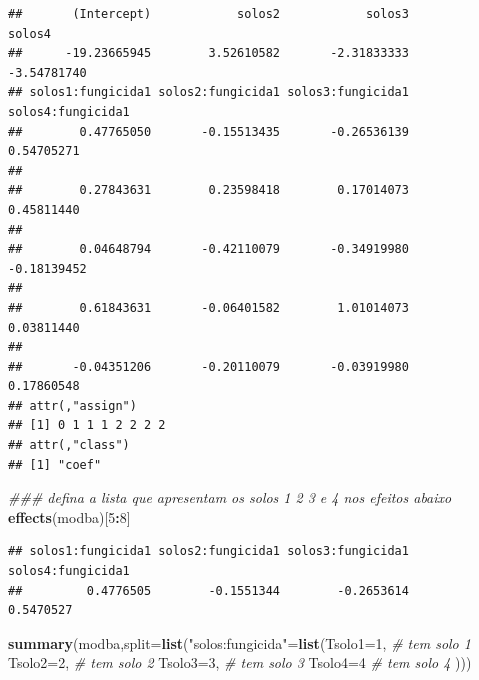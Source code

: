 \documentclass[
]{book}
\newenvironment{Shaded}{\begin{snugshade}}{\end{snugshade}}
\newcommand{\CommentTok}[1]{\textcolor[rgb]{0.56,0.35,0.01}{\textit{#1}}}
\newcommand{\DataTypeTok}[1]{\textcolor[rgb]{0.13,0.29,0.53}{#1}}
\newcommand{\DecValTok}[1]{\textcolor[rgb]{0.00,0.00,0.81}{#1}}
\newcommand{\KeywordTok}[1]{\textcolor[rgb]{0.13,0.29,0.53}{\textbf{#1}}}
\newcommand{\NormalTok}[1]{#1}
\newcommand{\OperatorTok}[1]{\textcolor[rgb]{0.81,0.36,0.00}{\textbf{#1}}}
\newcommand{\StringTok}[1]{\textcolor[rgb]{0.31,0.60,0.02}{#1}}
\begin{document}
\begin{verbatim}
##       (Intercept)            solos2            solos3            solos4 
##      -19.23665945        3.52610582       -2.31833333       -3.54781740 
## solos1:fungicida1 solos2:fungicida1 solos3:fungicida1 solos4:fungicida1 
##        0.47765050       -0.15513435       -0.26536139        0.54705271 
##                                                                         
##        0.27843631        0.23598418        0.17014073        0.45811440 
##                                                                         
##        0.04648794       -0.42110079       -0.34919980       -0.18139452 
##                                                                         
##        0.61843631       -0.06401582        1.01014073        0.03811440 
##                                                                         
##       -0.04351206       -0.20110079       -0.03919980        0.17860548 
## attr(,"assign")
## [1] 0 1 1 1 2 2 2 2
## attr(,"class")
## [1] "coef"
\end{verbatim}

\begin{Shaded}
\begin{Highlighting}[]
\CommentTok{### defina a lista que apresentam os solos 1 2 3 e 4 nos efeitos abaixo}
\KeywordTok{effects}\NormalTok{(modba)[}\DecValTok{5}\OperatorTok{:}\DecValTok{8}\NormalTok{]}
\end{Highlighting}
\end{Shaded}

\begin{verbatim}
## solos1:fungicida1 solos2:fungicida1 solos3:fungicida1 solos4:fungicida1 
##         0.4776505        -0.1551344        -0.2653614         0.5470527
\end{verbatim}

\begin{Shaded}
\begin{Highlighting}[]
\KeywordTok{summary}\NormalTok{(modba,}\DataTypeTok{split=}\KeywordTok{list}\NormalTok{(}\StringTok{"solos:fungicida"}\NormalTok{=}\KeywordTok{list}\NormalTok{(}\DataTypeTok{Tsolo1=}\DecValTok{1}\NormalTok{, }\CommentTok{# tem solo 1}
                                                \DataTypeTok{Tsolo2=}\DecValTok{2}\NormalTok{, }\CommentTok{# tem solo 2}
                                                \DataTypeTok{Tsolo3=}\DecValTok{3}\NormalTok{, }\CommentTok{# tem solo 3}
                                                \DataTypeTok{Tsolo4=}\DecValTok{4} \CommentTok{# tem solo 4}
\NormalTok{                                                ))) }
\end{Highlighting}
\end{Shaded}
\end{document}
